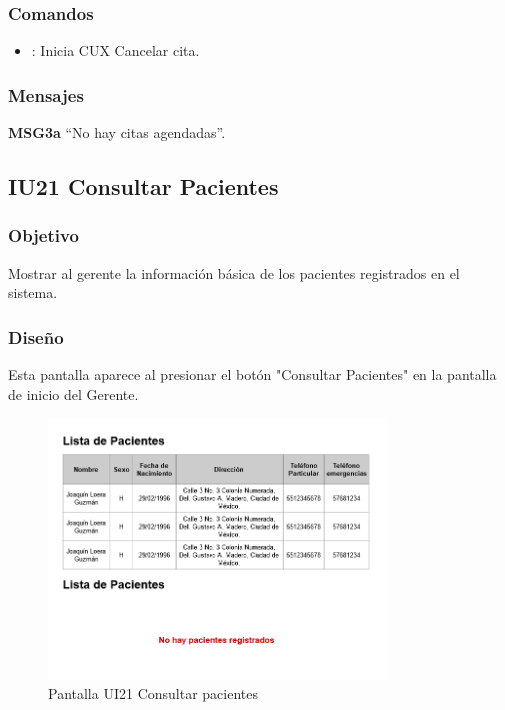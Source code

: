 \subsubsection{Comandos}
\begin{itemize}
	\item {}: Inicia CUX Cancelar cita.
\end{itemize}

\subsubsection{Mensajes}
\begin{Citemize}
	\item {\bf MSG3a} ``No hay citas agendadas''.
\end{Citemize}

\subsection{IU21 Consultar Pacientes}

\subsubsection{Objetivo}
Mostrar al gerente la información básica de los pacientes registrados en el sistema.

\subsubsection{Diseño}
Esta pantalla aparece al presionar el botón "Consultar Pacientes" en la pantalla de inicio del Gerente.

\begin{figure}[htbp!]
	\centering
	\includegraphics[width=0.8\textwidth]{images/gui/ui21_consultar_pacientes}
	\caption{Pantalla UI21 Consultar pacientes}
\end{figure}

